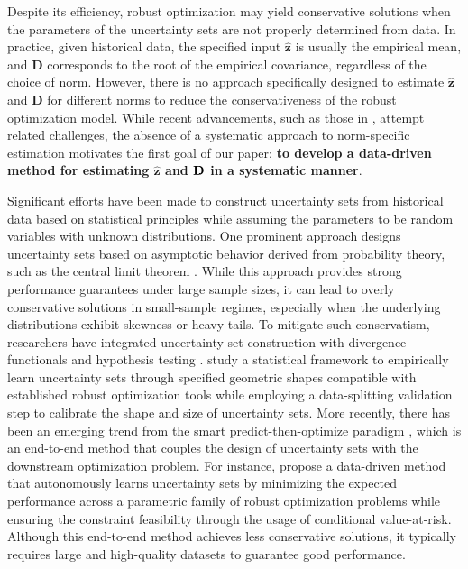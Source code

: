 \documentclass[mnsc, nonblindrev]{informswp}
\newcommand{\1}[1]{\mathds{1}{\left(#1\right)}}
\begin{document}

Despite its efficiency, robust optimization may yield conservative solutions when the parameters of the uncertainty sets are not properly determined from data. In practice, given historical data, the specified input \( \bm{\hat{z}} \) is usually the empirical mean, and \( \mathbf{D} \) corresponds to the root of the empirical covariance, regardless of the choice of norm. However, there is no approach specifically designed to estimate \( \bm{\hat{z}} \) and \( \mathbf{D} \) for different norms to reduce the conservativeness of the robust optimization model. While recent advancements, such as those in \cite{wang2023learning}, attempt related challenges, the absence of a systematic approach to norm-specific estimation motivates the first goal of our paper: {\bf to develop a data-driven method for estimating \( \bm{\hat{z}} \) and \( {\mathbf{D}} \) in a systematic manner}.

Significant efforts have been made to construct uncertainty sets from historical data based on statistical principles while assuming the parameters to be random variables with unknown distributions. One prominent approach designs uncertainty sets based on asymptotic behavior derived from probability theory, such as the central limit theorem \citep{bandi2012tractable}. While this approach provides strong performance guarantees under large sample sizes, it can lead to overly conservative solutions in small-sample regimes, especially when the underlying distributions exhibit skewness or heavy tails.
To mitigate such conservatism, researchers have integrated uncertainty set construction with divergence functionals \citep{ben2013robust} and hypothesis testing \citep{Bertsimas_Gupta_Kallus_2018data}.
\cite{hong2021learning} study a statistical framework to empirically learn uncertainty sets through specified geometric shapes compatible with established robust optimization tools while employing a data-splitting validation step to calibrate the shape and size of uncertainty sets. More recently, there has been an emerging trend from the smart predict-then-optimize paradigm \citep{Elmachtoub_Grigas_2021smart}, which is an end-to-end method that couples the design of uncertainty sets with the downstream optimization problem. For instance, \cite{wang2023learning} propose a data-driven method that autonomously learns uncertainty sets by minimizing the expected performance across a parametric family of robust optimization problems while ensuring the constraint feasibility through the usage of conditional value-at-risk. Although this end-to-end method achieves less conservative solutions, it typically requires large and high-quality datasets to guarantee good performance.
\end{document}

